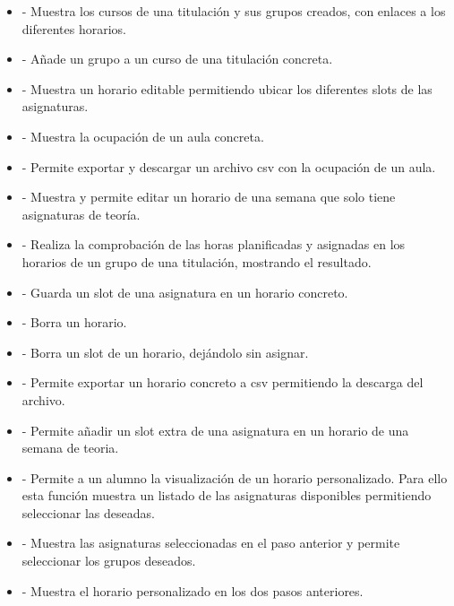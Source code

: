 \begin{itemize}
\item {} - Muestra los cursos de una titulación y sus grupos creados, con enlaces a los diferentes horarios.
\item {} - Añade un grupo a un curso de una titulación concreta.
\item {} - Muestra un horario editable permitiendo ubicar los diferentes slots de las asignaturas.
\item {} - Muestra la ocupación de un aula concreta.
\item {} - Permite exportar y descargar un archivo csv con la ocupación de un aula.
\item {} - Muestra y permite editar un horario de una semana que solo tiene asignaturas de teoría.
\item {} - Realiza la comprobación de las horas planificadas y asignadas en los horarios de un grupo de una titulación, mostrando el resultado.
\item {} - Guarda un slot de una asignatura en un horario concreto.
\item {} - Borra un horario.
\item {} - Borra un slot de un horario, dejándolo sin asignar.
\item {} - Permite exportar un horario concreto a csv permitiendo la descarga del archivo.
\item {} - Permite añadir un slot extra de una asignatura en un horario de una semana de teoria.
\item {} - Permite a un alumno la visualización de un horario personalizado. Para ello esta función muestra un listado de las asignaturas disponibles permitiendo seleccionar las deseadas.
\item {} - Muestra las asignaturas seleccionadas en el paso anterior y permite seleccionar los grupos deseados.
\item {} - Muestra el horario personalizado en los dos pasos anteriores.
\end{itemize}


